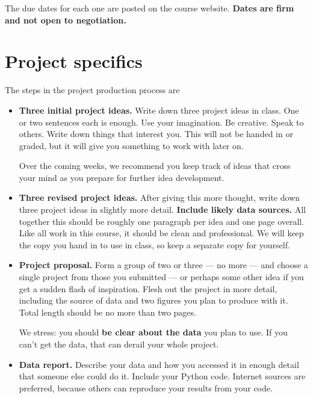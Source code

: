 \documentclass[11pt]{article}
\begin{document}
The due dates for each one are posted on the course website.
{\bf Dates are firm and not open to negotiation.}


\section*{Project specifics}

The steps in the project production process are
\begin{itemize}

\item {\bf Three initial project ideas.}
Write down three project ideas in class.
One or two sentences each is enough.
Use your imagination.  Be creative.  Speak to others.
Write down things that interest you.
This will not be handed in or graded, but it will give you something to work with later on.

Over the coming weeks, we recommend you keep track of ideas that cross
your mind as you prepare for further idea development.


\item {\bf Three revised project ideas.}
After giving this more thought, write down three project ideas in slightly more detail.
{\bf Include likely data sources.}  
All together this should be roughly one paragraph per idea and one page overall.
Like all work in this course, it should be clean and professional.
We will keep the copy you hand in to use in class, so keep a separate copy for yourself.

\item{\bf Project proposal.}
Form a group of two or three --- no more ---
and choose a single project from those you submitted ---
or perhaps some other idea if you get a sudden flash of inspiration.
Flesh out the project in more detail, including the source of data and
two figures you plan to produce with it.
Total length should be no more than two pages.

We stress:  you should {\bf be clear about the data} you plan to use.
If you can't get the data, that can derail your whole project.

\item {\bf Data report.}
Describe your data and how you accessed it in enough detail that someone else could do it.
Include your Python code.  %
Internet sources are preferred, because others can reproduce your results from your code.  



\end{itemize}
\end{document}
